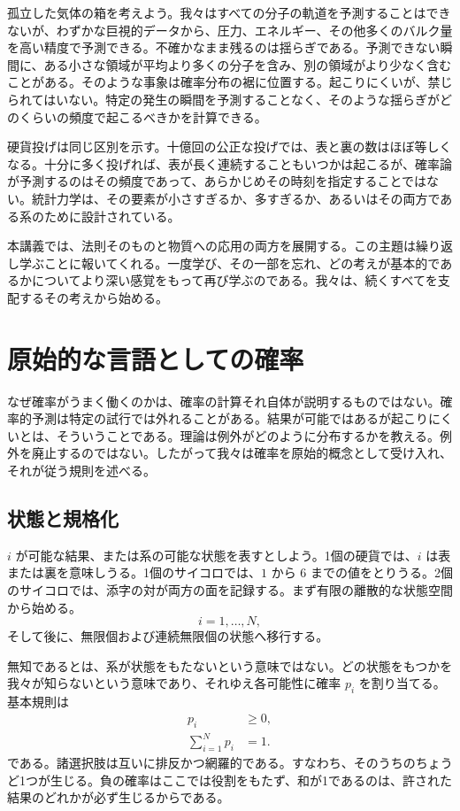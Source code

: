 孤立した気体の箱を考えよう。我々はすべての分子の軌道を予測することはできないが、わずかな巨視的データから、圧力、エネルギー、その他多くのバルク量を高い精度で予測できる。不確かなまま残るのは揺らぎである。予測できない瞬間に、ある小さな領域が平均より多くの分子を含み、別の領域がより少なく含むことがある。そのような事象は確率分布の裾に位置する。起こりにくいが、禁じられてはいない。特定の発生の瞬間を予測することなく、そのような揺らぎがどのくらいの頻度で起こるべきかを計算できる。

硬貨投げは同じ区別を示す。十億回の公正な投げでは、表と裏の数はほぼ等しくなる。十分に多く投げれば、表が長く連続することもいつかは起こるが、確率論が予測するのはその頻度であって、あらかじめその時刻を指定することではない。統計力学は、その要素が小さすぎるか、多すぎるか、あるいはその両方である系のために設計されている。

本講義では、法則そのものと物質への応用の両方を展開する。この主題は繰り返し学ぶことに報いてくれる。一度学び、その一部を忘れ、どの考えが基本的であるかについてより深い感覚をもって再び学ぶのである。我々は、続くすべてを支配するその考えから始める。

\section{原始的な言語としての確率}

なぜ確率がうまく働くのかは、確率の計算それ自体が説明するものではない。確率的予測は特定の試行では外れることがある。結果が可能ではあるが起こりにくいとは、そういうことである。理論は例外がどのように分布するかを教える。例外を廃止するのではない。したがって我々は確率を原始的概念として受け入れ、それが従う規則を述べる。

\subsection{状態と規格化}

\(i\) が可能な結果、または系の可能な状態を表すとしよう。1個の硬貨では、\(i\) は表または裏を意味しうる。1個のサイコロでは、\(1\) から \(6\) までの値をとりうる。2個のサイコロでは、添字の対が両方の面を記録する。まず有限の離散的な状態空間から始める。
\begin{equation}
 i=1,\ldots,N,
\end{equation}
そして後に、無限個および連続無限個の状態へ移行する。

無知であるとは、系が状態をもたないという意味ではない。どの状態をもつかを我々が知らないという意味であり、それゆえ各可能性に確率 \(p_i\) を割り当てる。基本規則は
\begin{align}
 p_i &\geq 0, \label{eq:sm1-prob-positive}\\
 \sum_{i=1}^{N}p_i &=1. \label{eq:sm1-prob-normalization}
\end{align}
である。諸選択肢は互いに排反かつ網羅的である。すなわち、そのうちのちょうど1つが生じる。負の確率はここでは役割をもたず、和が1であるのは、許された結果のどれかが必ず生じるからである。

